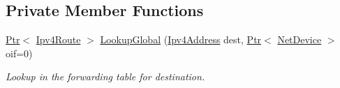 \subsection*{Private Member Functions}
\begin{DoxyCompactItemize}
\item 
\hyperlink{classns3_1_1Ptr}{Ptr}$<$ \hyperlink{classns3_1_1Ipv4Route}{Ipv4\+Route} $>$ \hyperlink{classns3_1_1Ipv4GlobalRouting_a647d7654f270ce66e46f26fc729f1d07}{Lookup\+Global} (\hyperlink{classns3_1_1Ipv4Address}{Ipv4\+Address} dest, \hyperlink{classns3_1_1Ptr}{Ptr}$<$ \hyperlink{classns3_1_1NetDevice}{Net\+Device} $>$ oif=0)
\begin{DoxyCompactList}\small\item\em Lookup in the forwarding table for destination. \end{DoxyCompactList}\end{DoxyCompactItemize}
